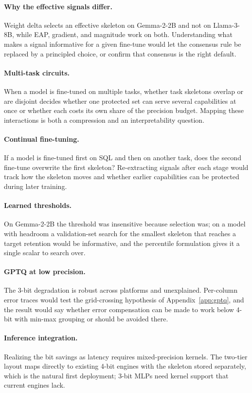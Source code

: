 \documentclass[11pt]{article}
\begin{document}
\paragraph{Why the effective signals differ.}
Weight delta selects an effective skeleton on Gemma-2-2B and 
not on Llama-3-8B, while EAP, gradient, and magnitude work on 
both. Understanding what makes a signal informative for a given 
fine-tune would let the consensus rule be replaced by a 
principled choice, or confirm that consensus is the right 
default.

\paragraph{Multi-task circuits.}
When a model is fine-tuned on multiple tasks, whether task 
skeletons overlap or are disjoint decides whether one protected 
set can serve several capabilities at once or whether each 
costs its own share of the precision budget. Mapping these 
interactions is both a compression and an interpretability 
question.

\paragraph{Continual fine-tuning.}
If a model is fine-tuned first on SQL and then on another 
task, does the second fine-tune overwrite the first skeleton? 
Re-extracting signals after each stage would track how the 
skeleton moves and whether earlier capabilities can be 
protected during later training.

\paragraph{Learned thresholds.}
On Gemma-2-2B the threshold was insensitive because selection 
was; on a model with headroom a validation-set search for the 
smallest skeleton that reaches a target retention would be 
informative, and the percentile formulation gives it a single 
scalar to search over.

\paragraph{GPTQ at low precision.}
The 3-bit degradation is robust across platforms and 
unexplained. Per-column error traces would test the 
grid-crossing hypothesis of Appendix~\ref{app:gptq}, and the 
result would say whether error compensation can be made to 
work below 4-bit with min-max grouping or should be avoided 
there.

\paragraph{Inference integration.}
Realizing the bit savings as latency requires mixed-precision 
kernels. The two-tier layout maps directly to existing 4-bit 
engines with the skeleton stored separately, which is the 
natural first deployment; 3-bit MLPs need kernel support that 
current engines lack.
\end{document}
